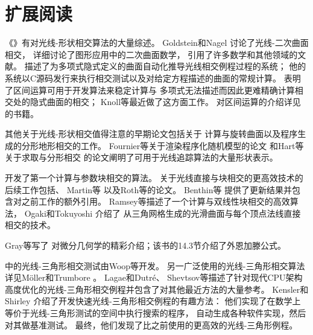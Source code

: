 \section{扩展阅读}\label{sec:扩展阅读03}
《》有对光线-形状相交算法的大量综述\citep{10.5555/94788}。
Goldstein和Nagel \parencite*{doi:10.1177/003754977101600104}讨论了光线-二次曲面相交，
\citet{Heckbert84themathematics}详细讨论了图形应用中的二次曲面数学，
引用了许多数学和其他领域的文献。
\citet{10.1145/964967.801136}描述了为多项式隐式定义的曲面自动化推导光线相交例程过程的系统；
他的系统以C源码发行来执行相交测试以及对给定方程描述的曲面的常规计算。
\citet{10.5555/93267.93276}表明了区间运算可用于开发算法来稳定计算与
多项式无法描述而因此更难精确计算相交处的隐式曲面的相交；
Knoll等\parencite*{10.1111/j.1467-8659.2008.01189.x}最近做了这方面工作。
对区间运算的介绍详见\citet{moore1966interval}的书籍。

其他关于光线-形状相交值得注意的早期论文包括\citet{10.1145/800059.801137}关于
计算与旋转曲面以及程序生成的分形地形相交的工作。
Fournier等\parencite*{10.1145/358523.358553}关于渲染程序化随机模型的论文
和Hart等\parencite*{10.1145/74333.74363}关于求取与分形相交
的论文阐明了可用于光线追踪算法的大量形状表示。

\citet{10.1145/800064.801287}开发了第一个计算与参数块相交的算法。
关于光线直接与块相交的更高效技术的后续工作包括\citet{722295}、
Martin等\parencite*{doi:10.1080/10867651.2000.10487519}
以及Roth等\parencite*{https://doi.org/10.1111/1467-8659.00535}的论文。
Benthin等\parencite*{doi:10.1080/2151237X.2006.10129218}
提供了更新结果并包含对之前工作的额外引用。
Ramsey等\parencite*{doi:10.1080/10867651.2004.10504896}描述了一个计算与双线性块相交的高效算法，
Ogaki和Tokuyoshi \parencite*{10.1111/j.1467-8659.2011.01993.x}介绍了
从三角网格生成的光滑曲面与每个顶点法线直接相交的技术。

Gray等\parencite*{gray2017modern}写了
对微分几何学的精彩介绍；该书的14.3节介绍了外恩加滕公式。

中的光线-三角形相交测试由Woop等\parencite*{Woop2013Watertight}开发。
另一广泛使用的光线-三角形相交算法详见Möller和Trumbore \parencite*{doi:10.1080/10867651.1997.10487468}。
Lagae和Dutré\parencite*{doi:10.1080/2151237X.2005.10129208}、
Shevtsov等\parencite*{shevtsov2007ray}描述了针对现代CPU架构
高度优化的光线-三角形相交例程并包含了对其他最近方法的大量参考。
Kensler和Shirley \parencite*{4061543}介绍了开发快速光线-三角形相交例程的有趣方法：
他们实现了在数学上等价于光线-三角形测试的空间中执行搜索的程序，
自动生成各种软件实现，然后对其做基准测试。
最终，他们发现了比之前使用的更高效的光线-三角形例程。

